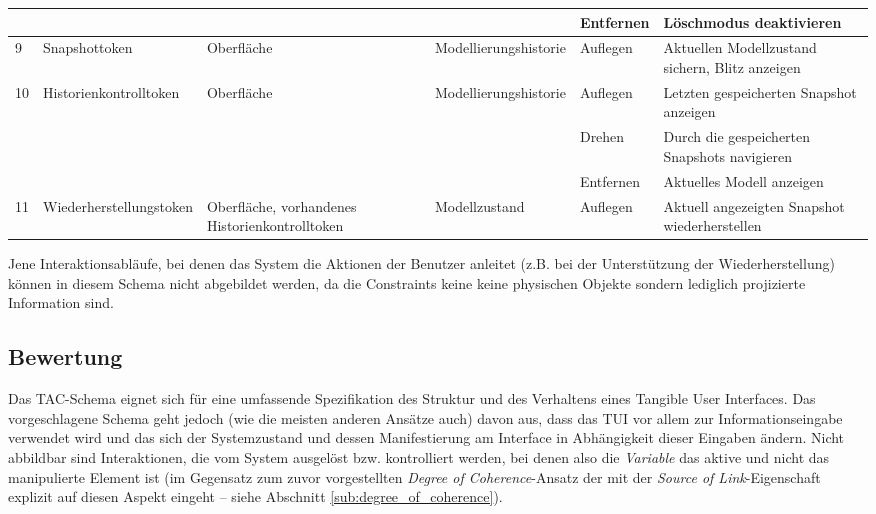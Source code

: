 \begin{longtable}{| p{} || p{} | p{2cm} || p{2cm} | p{2cm} | p{3cm} |}
		 				   &    	& 			 &  & Entfernen & Löschmodus deaktivieren \\ \hline
		9 & Snapshot\-token & Oberfläche & Modell\-ierungs\-historie & Auflegen & Aktuellen Modellzustand sichern, Blitz anzeigen \\ \hline
		\multirow{3}{*}{10} & Historien\-kontroll\-token & Oberfläche & Modell\-ierungs\-historie  & Auflegen & Letzten gespeicherten Snapshot anzeigen \\ \cline{5-6}
						   &   &			 &  & Drehen & Durch die gespeicherten Snapshots navigieren \\ \cline{5-6}
						   &   &			 &  & Entfernen & Aktuelles Modell anzeigen \\ \hline
		11 & Wieder\-herstellungs\-token & Oberfläche, vorhandenes Historien\-kontroll\-token & Modell\-zustand & Auflegen & Aktuell angezeigten Snapshot wiederherstellen \\ \hline

	\end{longtable}

Jene Interaktionsabläufe, bei denen das System die Aktionen der Benutzer anleitet (z.B. bei der Unterstützung der Wiederherstellung) können in diesem Schema nicht abgebildet werden, da die Constraints keine keine physischen Objekte sondern lediglich projizierte Information sind.

\subsection{Bewertung} %

Das TAC-Schema eignet sich für eine umfassende Spezifikation des Struktur und des Verhaltens eines Tangible User Interfaces. Das vorgeschlagene Schema geht jedoch (wie die meisten anderen Ansätze auch) davon aus, dass das \gls{TUI} vor allem zur Informationseingabe verwendet wird und das sich der Systemzustand und dessen Manifestierung am Interface in Abhängigkeit dieser Eingaben ändern. Nicht abbildbar sind Interaktionen, die vom System ausgelöst bzw. kontrolliert werden, bei denen also die \emph{Variable} das aktive und nicht das manipulierte Element ist (im Gegensatz zum zuvor vorgestellten \emph{Degree of Coherence}-Ansatz der mit der \emph{Source of Link}-Eigenschaft explizit auf diesen Aspekt eingeht -- siehe Abschnitt \ref{sub:degree_of_coherence}).

